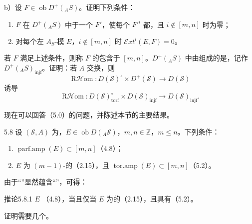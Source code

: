 b）设 $F\in\operatorname{ob}D^+({}_AS)$\footnotemark[\value{footnote}]。证明下列条件：
\begin{enumerate}
\item[(i)] $F$ 在 $D^+({}_AS)$ 中于一个 $F'$，使每个 $F'^i$ 都，且 $i\notin[m,n]$ 时为零；
\item[(ii)] 对每个左 $A_S$-模 $E$，$i\notin[m,n]$ 时 $\mathcal Ext^i(E,F)=0$。
\end{enumerate}
若 $F$ 满足上述条件，则称 $F$ 的包含于 $[m,n]$。$D^+({}_AS)$ 中由组成的是，记作 $D^+({}_AS)_{\mathrm{injf}}$。证明：若 $A$ 交换，则
\[\operatorname{R\mathcal Hom}:D(\mathscr S)^\circ\times D^+(\mathscr S)\longrightarrow D(\mathscr S)\]
诱导
\[\operatorname{R\mathcal Hom}:D(\mathscr S)_{\mathrm{torf}}^\circ\times D(\mathscr S)_{\mathrm{injf}}\longrightarrow D(\mathscr S)_{\mathrm{injf}}.\]

现在可以回答（5.0）的问题，并陈述本节的主要结果。
\begin{SGAresult}{}{5.8}
设 $(\mathscr S,A)$ 为，$E\in\operatorname{ob}D({}_A\mathscr S)$，$m,n\in\mathbb Z$，$m\leq n$。下列条件：
\begin{enumerate}
\item[(i)] $\operatorname{parf.amp}(E)\subset[m,n]$（4.8）；
\item[(ii)] $E$ 为 $(m-1)$-的（2.15），且 $\operatorname{tor.amp}(E)\subset[m,n]$（5.2）。
\end{enumerate}
\end{SGAresult}
由于“”显然蕴含“”，可得：
\begin{SGAresult}{推论}{5.8.1}
$E$ （4.8），当且仅当 $E$ 为的（2.15），且具有（5.2）。
\end{SGAresult}
证明需要几个。

